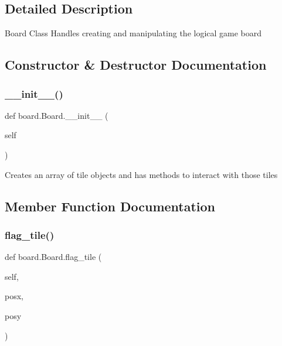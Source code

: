 \subsection{Detailed Description}
\begin{DoxyVerb}Board Class
Handles creating and manipulating the logical game board\end{DoxyVerb}
 

\subsection{Constructor \& Destructor Documentation}
\mbox{\label{classboard_1_1_board_a35203bbf9b43a84ecfea81eb7cbe66fd}} 
\subsubsection{\texorpdfstring{\+\_\+\+\_\+init\+\_\+\+\_\+()}{\_\_init\_\_()}}
{\footnotesize\ttfamily def board.\+Board.\+\_\+\+\_\+init\+\_\+\+\_\+ (\begin{DoxyParamCaption}\item[{}]{self }\end{DoxyParamCaption})}

\begin{DoxyVerb}Creates an array of tile objects and has methods to interact with those tiles\end{DoxyVerb}
 

\subsection{Member Function Documentation}
\mbox{\label{classboard_1_1_board_aabde992af88c3219259f21f4217b0d83}} 
\subsubsection{\texorpdfstring{flag\+\_\+tile()}{flag\_tile()}}
{\footnotesize\ttfamily def board.\+Board.\+flag\+\_\+tile (\begin{DoxyParamCaption}\item[{}]{self,  }\item[{}]{posx,  }\item[{}]{posy }\end{DoxyParamCaption})}

